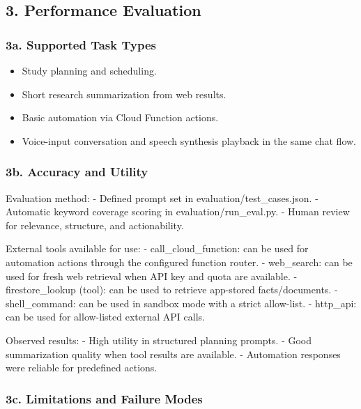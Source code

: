 \documentclass[
]{article}
\providecommand{\tightlist}{%
  \setlength{\itemsep}{0pt}\setlength{\parskip}{0pt}}
\begin{document}
\subsection{3. Performance Evaluation}\label{performance-evaluation}

\subsubsection{3a. Supported Task Types}\label{a.-supported-task-types}

\begin{itemize}
\tightlist
\item
  Study planning and scheduling.
\item
  Short research summarization from web results.
\item
  Basic automation via Cloud Function actions.
\item
  Voice-input conversation and speech synthesis playback in the same
  chat flow.
\end{itemize}

\subsubsection{3b. Accuracy and Utility}\label{b.-accuracy-and-utility}

Evaluation method: - Defined prompt set in evaluation/test\_cases.json.
- Automatic keyword coverage scoring in evaluation/run\_eval.py. - Human
review for relevance, structure, and actionability.

External tools available for use: - call\_cloud\_function: can be used
for automation actions through the configured function router. -
web\_search: can be used for fresh web retrieval when API key and quota
are available. - firestore\_lookup (tool): can be used to retrieve
app-stored facts/documents. - shell\_command: can be used in sandbox
mode with a strict allow-list. - http\_api: can be used for allow-listed
external API calls.

Observed results: - High utility in structured planning prompts. - Good
summarization quality when tool results are available. - Automation
responses were reliable for predefined actions.

\subsubsection{3c. Limitations and Failure
Modes}\label{c.-limitations-and-failure-modes}
\end{document}
